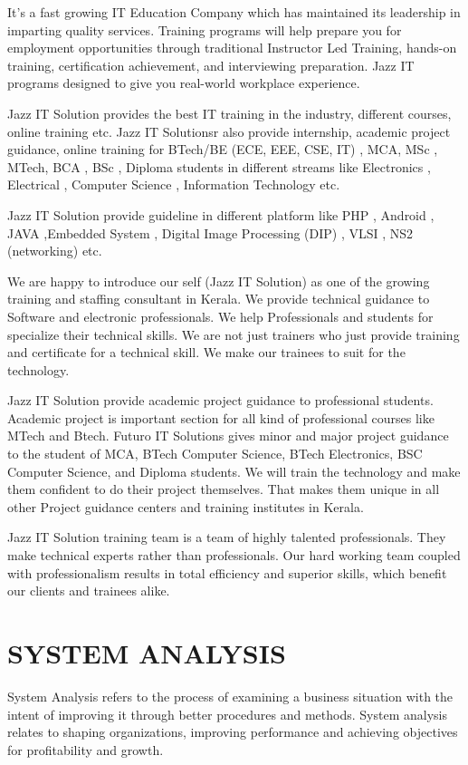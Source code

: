 	It’s a fast growing IT Education Company which has maintained its leadership in imparting quality services. Training programs will help prepare you for employment opportunities through traditional Instructor Led Training, hands-on training, certification achievement, and interviewing preparation. Jazz IT programs designed to give you real-world workplace experience.


	Jazz IT Solution provides the best IT training in the industry, different courses, online training etc. Jazz IT Solutionsr also provide internship, academic project guidance, online training for BTech/BE (ECE, EEE, CSE, IT) , MCA, MSc , MTech, BCA , BSc , Diploma students in different streams like Electronics , Electrical , Computer Science , Information Technology etc.


	Jazz IT Solution provide guideline in different platform like PHP , Android , JAVA ,Embedded System , Digital Image Processing (DIP) , VLSI , NS2 (networking) etc.

We are happy to introduce our self (Jazz IT Solution) as one of the growing training and staffing consultant in Kerala. We provide technical guidance to Software and electronic professionals. We help Professionals and students for specialize their technical skills. We are not just trainers who just provide training and certificate for a technical skill. We make our trainees to suit for the technology.


Jazz IT Solution provide academic project guidance to professional students. Academic project is important section for all kind of professional courses like MTech and Btech. Futuro IT Solutions gives minor and major project guidance to the student of MCA, BTech Computer Science, BTech Electronics, BSC Computer Science, and Diploma students. We will train the technology and make them confident to do their project themselves. That makes them unique in all other Project guidance centers and training institutes in Kerala.


Jazz IT Solution training team is a team of highly talented professionals. They make technical experts rather than professionals. Our hard working team coupled with professionalism results in total efficiency and superior skills, which benefit our clients and trainees alike.
%
%
%
%
\chapter{SYSTEM ANALYSIS}
 System Analysis refers to the process of examining a business situation with the intent of improving it through better procedures and methods. System analysis relates to shaping organizations, improving performance and achieving objectives for profitability and growth. 

